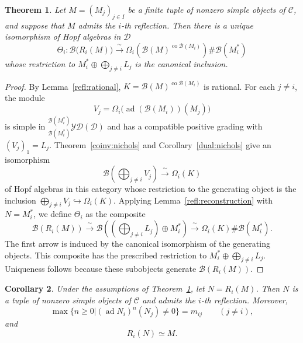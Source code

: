 \documentclass[11pt, a4paper]{article}
\numberwithin{equation}{section}
\newcommand{\C}{\mathcal C}
\newcommand{\D}{\mathcal D}
\newcommand{\B}{\mathcal B}
\newcommand{\YD}{\mathcal{YD}}
\DeclareMathOperator{\ad}{ad}
\DeclareMathOperator{\co}{co}
\newtheorem{theorem}{Theorem}[section]
\newtheorem{corollary}[theorem]{Corollary}
\begin{document}
\begin{theorem}\label{refl:main}
Let $M=(M_j)_{j\in I}$ be a finite tuple of nonzero simple
objects of $\C$, and suppose that $M$ admits the $i$-th reflection.
Then there is a unique isomorphism of Hopf algebras in $\D$
\[
 \Theta_i:\B\bigl(R_i(M)\bigr)
 \xrightarrow{\ \sim\ }
 \Omega_i\!\left(\B(M)^{\co\B(M_i)}\right)\#\B(M_i^*)
\]
whose restriction to
$M_i^*\oplus\bigoplus_{j\neq i}L_j$
is the canonical inclusion.
\end{theorem}

\begin{proof}
By Lemma~\ref{refl:rational},
$K=\B(M)^{\co\B(M_i)}$ is rational.
For each $j\neq i$, the module
\[
 V_j=\Omega_i\bigl(\ad(\B(M_i))(M_j)\bigr)
\]
is simple in ${}_{\B(M_i^*)}^{\B(M_i^*)}\YD(\D)$
and has a compatible positive grading with
$(V_j)_1=L_j$.
Theorem~\ref{coinv:nichols} and
Corollary~\ref{dual:nichols} give an isomorphism
\[
 \B\!\left(\bigoplus_{j\neq i}V_j\right)
   \xrightarrow{\ \sim\ }\Omega_i(K)   
\]
of Hopf algebras in this category  {whose} restriction to  {the
generating object is the inclusion}
$\bigoplus_{j\neq i}V_j  \hookrightarrow\Omega_i(K)   $.
Applying Lemma~\ref{refl:reconstruction} with $N=M_i^*$,
we define $\Theta_i$ as the composite
\[
 {
 \B(R_i(M))
 \xrightarrow{\ \sim\ }
 \B\left(
   \left(\bigoplus_{j\neq i}L_j\right)\oplus M_i^*
 \right)
 \xrightarrow{\ \sim\ }
 \Omega_i(K)\#\B(M_i^*).
 }
\]
The first arrow is induced by the canonical isomorphism
of the generating objects.
This composite has the prescribed restriction to
$M_i^*\oplus\bigoplus_{j\neq i}L_j$.
Uniqueness follows because these subobjects generate
$\B(R_i(M))$.

\end{proof}

\begin{corollary}\label{refl:root-grading}
Under the assumptions of Theorem~\ref{refl:main}, let $N=R_i(M)$.
Then $N$ is a tuple of nonzero simple objects of $\C$ and
admits the $i$-th reflection. Moreover,
\[
 \max\{{{n}}\geq0| (\ad N_i)^{{n}}(N_j)\neq0\}=m_{ij}
 \qquad(j\neq i),
\]
and
\[
 R_i(N)\simeq M.
\]
\end{corollary}
\end{document}
